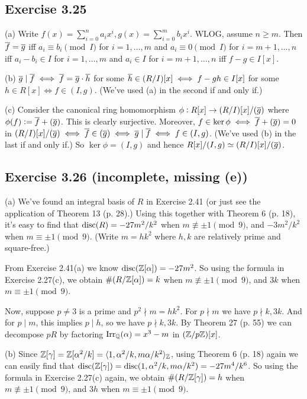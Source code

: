 \documentclass[../Marcus.tex]{subfiles}
\begin{document}
\subsection*{Exercise 3.25}

(a) Write $f(x)=\sum_{i=0}^n a_ix^i,g(x)=\sum_{i=0}^m b_ix^i$. WLOG, assume $n\geq m$. Then $\overline{f}=\overline{g}$ iff $a_i\equiv b_i\pmod{I}$ for $i=1,\ldots,m$ and $a_i\equiv 0\pmod{I}$ for $i=m+1,\ldots,n$ iff $a_i-b_i\in I$ for $i=1,\ldots,m$ and $a_i\in I$ for $i=m+1,\ldots,n$ iff $f-g\in I[x]$.

(b) $\overline{g}\mid\overline{f} \iff \overline{f}=\overline{g}\cdot\overline{h}$ for some $\overline{h}\in (R/I)[x] \iff f-gh\in I[x]$ for some $h\in R[x] \iff f\in(I,g)$. (We've used (a) in the second if and only if.)

(c) Consider the canonical ring homomorphism $\phi:R[x]\to(R/I)[x]/(\overline{g})$ where $\phi(f):=\overline{f}+(\overline{g})$. This is clearly surjective. Moreover, $f\in\ker\phi \iff \overline{f}+(\overline{g})=0$ in $(R/I)[x]/(\overline{g}) \iff \overline{f}\in(\overline{g}) \iff \overline{g}\mid\overline{f} \iff f\in(I,g)$. (We've used (b) in the last if and only if.) So $\ker\phi=(I,g)$ and hence $R[x]/(I,g)\simeq (R/I)[x]/(\overline{g})$.

\subsection*{Exercise 3.26 \color{red}(incomplete, missing (e))}

(a) We've found an integral basis of $R$ in Exercise 2.41 (or just see the application of Theorem 13 (p. 28).) Using this together with Theorem 6 (p. 18), it's easy to find that $\operatorname{disc}(R)=-27m^2/k^2$ when $m\not\equiv \pm1 \pmod{9}$, and
$-3m^2/k^2$ when $m\equiv \pm1 \pmod{9}$. (Write $m=hk^2$ where $h,k$ are relatively prime and square-free.)

From Exercise 2.41(a) we know $\operatorname{disc}(\mathbb{Z}[\alpha])=-27m^2$. So using the formula in Exercise 2.27(c), we obtain $\#(R/\mathbb{Z}[\alpha])=k$ when $m\not\equiv \pm1 \pmod{9}$, and $3k$ when $m\equiv \pm1 \pmod{9}$.

Now, suppose $p\neq 3$ is a prime and $p^2\nmid m=hk^2$. For $p\nmid m$ we have $p\nmid k,3k$. And for $p\mid m$, this implies $p\mid h$, so we have $p\nmid k,3k$. By Theorem 27 (p. 55) we can decompose $pR$ by factoring $\operatorname{Irr}_{\mathbb{Q}}(\alpha)=x^3-m$ in $(\mathbb{Z}/p\mathbb{Z})[x]$.

(b) Since $\mathbb{Z}[\gamma]=\mathbb{Z}[\alpha^2/k]=\langle1,\alpha^2/k,m\alpha/k^2\rangle_{\mathbb{Z}}$, using Theorem 6 (p. 18) again we can easily find that $\operatorname{disc}(\mathbb{Z}[\gamma])=\operatorname{disc}(1,\alpha^2/k,m\alpha/k^2)=-27m^4/k^6$. So using the formula in Exercise 2.27(c) again, we obtain $\#(R/\mathbb{Z}[\gamma])=h$ when $m\not\equiv \pm1 \pmod{9}$, and $3h$ when $m\equiv \pm1 \pmod{9}$.
\end{document}
